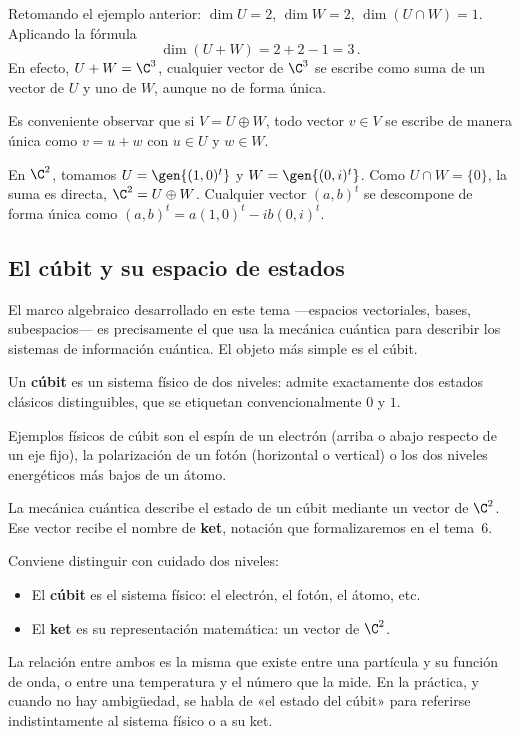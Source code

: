 \begin{eje}
  Retomando el ejemplo anterior: $\dim U=2$, $\dim W=2$, $\dim(U\cap W)=1$. Aplicando la fórmula
  \[
    \dim(U+W) = 2+2-1 = 3\,.
  \]
  En efecto, $U+W = \C^3$, cualquier vector de $\C^3$ se escribe como suma de un vector de $U$ y uno de $W$, aunque no de forma única.
\end{eje}

Es conveniente observar que si $V = U\oplus W$, todo vector $v\in V$ se escribe de manera única como $v = u+w$ con $u\in U$ y $w\in W$.


\begin{eje}
  En $\C^2$, tomamos $U=\gen{(1,0)^t}$ y $W=\gen{(0,i)^t}$. Como $U\cap W=\{0\}$, la suma es directa, $\C^2 = U\oplus W$. Cualquier vector $(a,b)^t$ se descompone de forma única como $(a,b)^t = a(1,0)^t - ib(0,i)^t$.
\end{eje}

\subsection{El cúbit y su espacio de estados}

El marco algebraico desarrollado en este tema —espacios vectoriales, bases, subespacios— es precisamente el que usa la mecánica cuántica para describir los sistemas de información cuántica. El objeto más simple es el cúbit.

\begin{defi}[Cúbit]
  \label{def:cubit}
  Un \textbf{cúbit} es un sistema físico de dos niveles: admite exactamente dos estados clásicos distinguibles, que se etiquetan convencionalmente $0$ y $1$.
\end{defi}

Ejemplos físicos de cúbit son el espín de un electrón (arriba o abajo respecto de un eje fijo), la polarización de un fotón (horizontal o vertical) o los dos niveles energéticos más bajos de un átomo.

La mecánica cuántica describe el estado de un cúbit mediante un vector de $\C^2$. Ese vector recibe el nombre de \textbf{ket}, notación que formalizaremos en el tema~6.

\begin{nota}
  Conviene distinguir con cuidado dos niveles:
  \begin{itemize}
    \item El \textbf{cúbit} es el sistema físico: el electrón, el fotón, el átomo, etc.
    \item El \textbf{ket} es su representación matemática: un vector de $\C^2$.
  \end{itemize}
  La relación entre ambos es la misma que existe entre una partícula y su función de onda, o entre una temperatura y el número que la mide. En la práctica, y cuando no hay ambigüedad, se habla de «el estado del cúbit» para referirse indistintamente al sistema físico o a su ket.
\end{nota}

